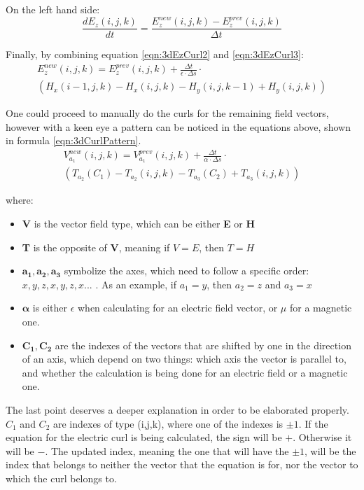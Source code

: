 On the left hand side:
\begin{equation}
	\label{eqn:3dEzCurl3}
	\frac{d E_z(i,j,k)}{dt} = \frac{E_z^{new}(i,j,k) - E_z^{prev}(i,j,k)}{\Delta t}
\end{equation}

Finally, by combining equation \ref{eqn:3dEzCurl2} and \ref{eqn:3dEzCurl3}:
\begin{multline}
	\label{eqn:3dEzCurlFinal}
	E_z^{new}(i,j,k) =  E_z^{prev}(i,j,k) + \frac{\Delta t}{\epsilon \cdot \Delta s} \cdot \\ (H_x(i-1,j,k) - H_x(i,j,k) - H_y(i,j,k-1) + H_y(i,j,k))
\end{multline}

One could proceed to manually do the curls for the remaining field vectors, however with a keen eye a pattern can be noticed in the equations above, shown in formula \ref{eqn:3dCurlPattern}.
\begin{multline}
	\label{eqn:3dCurlPattern}
	V_{a_1}^{new}(i,j,k) =  V_{a_1}^{prev}(i,j,k) + \frac{\Delta t}{\alpha \cdot \Delta s} \cdot \\ (T_{a_2}(C_1) - T_{a_2}(i,j,k) - T_{a_3}(C_2) + T_{a_3}(i,j,k))
\end{multline}

where:

\begin{itemize}
	\item \textbf{V} is the vector field type, which can be either \textbf{E} or \textbf{H}
	\item \textbf{T} is the opposite of \textbf{V}, meaning if $V = E$, then $T = H$
	\item $\boldsymbol{a_1,a_2,a_3}$ symbolize the axes, which need to follow a specific order: $x,y,z,x,y,z,x...$ . As an example, if $a_1 = y$, then $a_2 = z$ and $a_3 = x$
	\item $\boldsymbol{\alpha}$ is either $\epsilon$ when calculating for an electric field vector, or $\mu$ for a magnetic one.
	\item $\boldsymbol{C_1, C_2}$ are the indexes of the vectors that are shifted by one in the direction of an axis, which depend on two things: which axis the vector is parallel to, and whether the calculation is being done for an electric field or a magnetic one.
\end{itemize}

The last point deserves a deeper explanation in order to be elaborated properly. $C_1$ and $C_2$ are indexes of type (i,j,k), where one of the indexes is $\pm1$. If the equation for the electric curl is being calculated, the sign will be $+$. Otherwise it will be $-$. The updated index, meaning the one that will have the $\pm1$, will be the index that belongs to neither the vector that the equation is for, nor the vector to which the curl belongs to.

